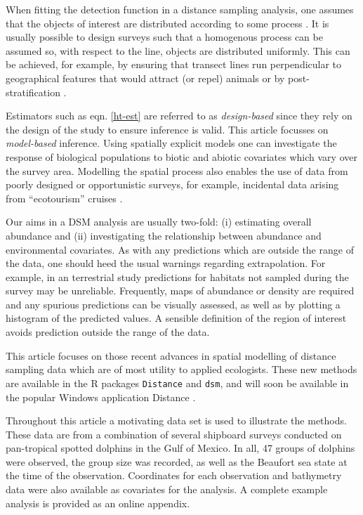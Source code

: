 \documentclass[a4paper,12pt]{article}
\begin{document}
When fitting the detection function in a distance sampling analysis, one assumes that the objects of interest are distributed according to some process \citep[Section 2.1]{Buckland:2001vm}. It is usually possible to design surveys such that a homogenous process can be assumed so, with respect to the line, objects are distributed uniformly. This can be achieved, for example, by ensuring that transect lines run perpendicular to geographical features that would attract (or repel) animals or by post-stratification \citep[Section 3.7]{Buckland:2001vm}. 

Estimators such as eqn. \ref{ht-est} are referred to as \textit{design-based} since they rely on the design of the study to ensure inference is valid. This article focusses on \textit{model-based} inference. Using spatially explicit models one can investigate the response of biological populations to biotic and abiotic covariates which vary over the survey area. Modelling the spatial process also enables the use of data from poorly designed or opportunistic surveys, for example, incidental data arising from ``ecotourism'' cruises \citep{Williams:2006tz}. 

Our aims in a DSM analysis are usually two-fold: (i) estimating overall abundance and (ii) investigating the relationship between abundance and environmental covariates. As with any predictions which are outside the range of the data, one should heed the usual warnings regarding extrapolation. For example, in an terrestrial study predictions for habitats not sampled during the survey may be unreliable. Frequently, maps of abundance or density are required and any spurious predictions can be visually assessed, as well as by plotting a histogram of the predicted values. A sensible definition of the region of interest avoids prediction outside the range of the data.

This article focuses on those recent advances in spatial modelling of distance sampling data which are of most utility to applied ecologists. These new methods are available in the \textsf{R} packages \texttt{Distance} and \texttt{dsm}, and will soon be available in the popular Windows application Distance \citep{Thomas:2010cf}.

Throughout this article a motivating data set is used to illustrate the methods. These data are from a combination of several shipboard surveys conducted on pan-tropical spotted dolphins in the Gulf of Mexico. In all, 47 groups of dolphins were observed, the group size was recorded, as well as the Beaufort sea state at the time of the observation. Coordinates for each observation and bathymetry data were also available as covariates for the analysis. A complete example analysis is provided as an online appendix.
\end{document}
